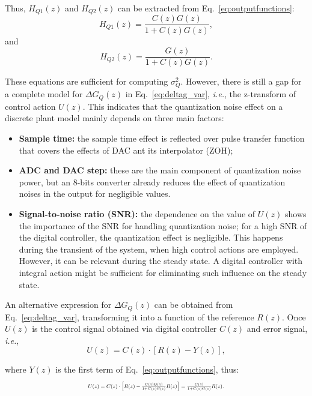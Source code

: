 \documentclass{sig-alternate-05-2015}
\begin{document}
Thus, $H_{Q1}(z)$ and $H_{Q2}(z)$ can be extracted from Eq.~\eqref{eq:outputfunctions}:
\begin{equation}
H_{Q1}(z)=\frac{C(z)G(z)}{1+C(z)G(z)},
\end{equation}
and
\begin{equation}
H_{Q2}(z)=\frac{G(z)}{1+C(z)G(z)}.
\end{equation}

These equations are sufficient for computing $\sigma_{Q}^{2}$.  However,
there is still a gap for a complete model for $\Delta{G_{Q}(z)}$ in
Eq.~\eqref{eq:deltag_var}, {\it i.e.}, the z-transform of control action
$U(z)$.  This indicates that the quantization noise effect on a discrete
plant model mainly depends on three main factors:
%
\begin{itemize}
%
\item \textbf{Sample time:} the sample time effect is reflected over pulse transfer function that covers the effects of DAC ant its interpolator (ZOH);
%
\item \textbf{ADC and DAC step: } these are the main component of quantization noise power, but an $8$-bits converter already reduces the effect of quantization noises in the output for negligible values.
%
\item \textbf{Signal-to-noise ratio (SNR): } the dependence on the value of $U(z)$ shows the importance of the SNR for handling quantization noise; for a high SNR of the digital controller, the quantization effect is negligible. This happens during the transient of the system, when high control actions are employed. However, it can be relevant during the steady state. A digital controller with integral action might be sufficient for eliminating such influence on the steady state.
%
\end{itemize}

An alternative expression for $\Delta{G_{Q}(z)}$ can be obtained from
Eq.~\eqref{eq:deltag_var}, transforming it into a function of the reference
$R(z)$.  Once $U(z)$ is the control signal obtained via digital controller
$C(z)$ and error signal, {\it i.e.},
%
\begin{equation}
U(z)=C(z)\cdot[R(z)-Y(z)],
\end{equation} 

\noindent where $Y(z)$ is the first term of Eq.~\eqref{eq:outputfunctions}, thus:
\begin{equation}
\label{eq:controlsignal}
\resizebox{0.48\textwidth}{!}{
$U(z)=C(z)\cdot \left[R(z)-\frac{C(z)G(z)}{1+C(z)G(z)}R(z)\right]=\frac{C(z)}{1+C(z)G(z)}R(z).$
}
\end{equation} 
\end{document}
